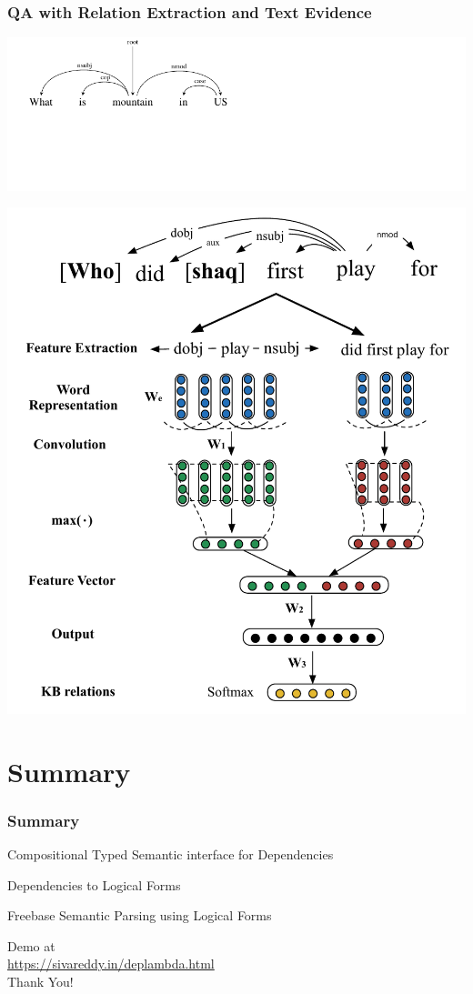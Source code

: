 \documentclass[mathserif,12pt]{beamer}
\newcommand{\hlight}[1]{{\color{blue!80} #1}}
\begin{document}
\begin{frame}
\frametitle{QA with Relation Extraction and Text Evidence}
\includegraphics[trim=-12em 0em 0em 0em,clip=true,scale=0.7]{figures/natural-logic-argmax1}

\vspace{-4em}
\includegraphics[trim=-12em 0em 0em 0em,clip=true,scale=0.4]{figures/MCCNN}
\end{frame}

\section{Summary}
\begin{frame}
\frametitle{Summary}
\large


Compositional Typed Semantic interface for Dependencies
 
\vspace{2em} 
Dependencies to Logical Forms

 \vspace{2em}
Freebase Semantic Parsing using Logical Forms

\vspace{2em}
\begin{center}Demo at\\ \hlight{\url{https://sivareddy.in/deplambda.html}} \\
  Thank You!
\end{center}
\end{frame}
\end{document}
